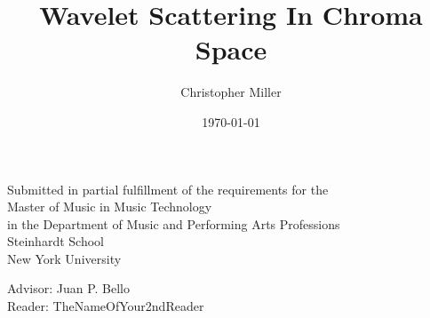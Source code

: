 \documentclass[12pt]{article}
\begin{document}
\author{Christopher Miller} 
\title{Wavelet Scattering In Chroma Space}
\date{}
\maketitle

\vspace{75mm}

\begin{center}
Submitted in partial fulfillment of the requirements for the \\
Master of Music in Music Technology \\
in the Department of Music and Performing Arts Professions \\
Steinhardt School \\
New York University \\

\vspace{10mm}

Advisor: Juan P. Bello \\
Reader: TheNameOfYour2ndReader \\

\vspace{10mm}
\date{\today}
\end{center}
\thispagestyle{empty}














\appendix 

\end{document}
